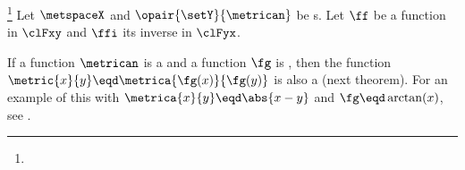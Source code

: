 \begin{theorem}
\footnote{
  }
\label{thm:isometry_inv}
Let $\metspaceX$ and $\opair{\setY}{\metrican}$ be s.
Let $\ff$ be a function in $\clFxy$ and $\ffi$ its inverse in $\clFyx$.
\end{theorem}


If a function $\metrican$ is a  and a function $\fg$ is , then 
the function $\metric{x}{y}\eqd\metrica{\fg(x)}{\fg(y)}$ is also a  (next theorem).
For an example of this with $\metrica{x}{y}\eqd\abs{x-y}$ and $\fg\eqd\arctan(x)$, see .

